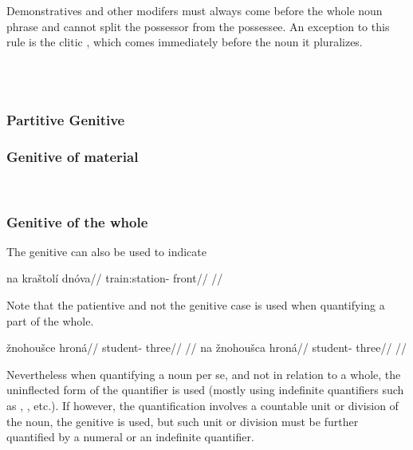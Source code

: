 Demonstratives and other modifers must always come before
the whole noun phrase and cannot split the possessor from the possessee. An
exception to this rule is the clitic , which comes immediately before
the noun it pluralizes.

\pex
\a  {}\\
\a  {}\\
\xe

\subsubsection{Partitive Genitive}

\subsubsection{Genitive of material}

\ex
{}\\
\irdp{}{}
\xe

\subsubsection{Genitive of the whole}
The genitive can also be used to indicate

\pex
\begingl
\gla na kraštolí dnóva//
\glb {} train:station- front//
\glft {}//
\endgl
\xe

Note that the patientive and not the genitive case is used when quantifying a part of the whole.

\pex
\a
\begingl
\gla *žnohoušce hroná//
\glb student- three//
\glft {}//
\endgl
\a
\begingl
\gla na žnohoušca hroná//
\glb {} student- three//
\glft {}//
\endgl
\xe

Nevertheless when quantifying a noun per se, and not in relation to a whole, the uninflected form of the quantifier is used (mostly using indefinite quantifiers such as , , etc.). If however, the quantification involves a countable unit or division of the noun, the genitive is used, but such unit or division must be further quantified by a numeral or an indefinite quantifier.

